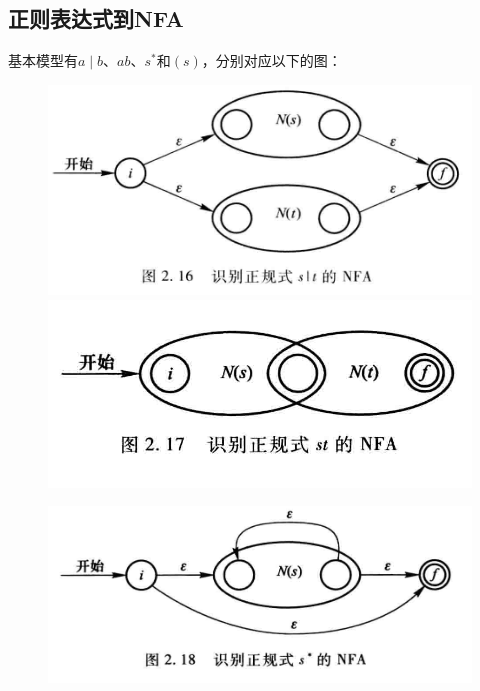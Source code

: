 \documentclass[]{report}
\begin{document}
		\subsection{正则表达式到NFA}
		基本模型有$a\mid b$、$ab$、$s^*$和$(s)$，分别对应以下的图：
		\begin{figure}[h!]
			\centering
			\begin{minipage}{40em}
				\begin{minipage}{18em}
					\centering
					\includegraphics[scale = 0.18]{images/s_mid_t.png}
				\end{minipage}
				\begin{minipage}{18em}
					\centering
					\includegraphics[scale = 0.23]{images/st.png}
				\end{minipage}
			\end{minipage}
		\end{figure}
		\begin{figure}[ht!]
			\centering
			\begin{minipage}{30em}
				\centering
				\includegraphics[scale = 0.25]{images/s_star.png}
			\end{minipage}
		\end{figure}
\end{document}
